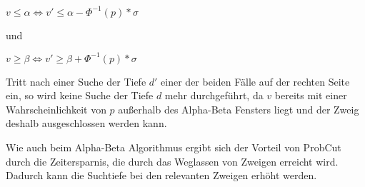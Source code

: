 \hspace*{1.3cm}
\(v\leq\alpha \iff v'\leq\alpha-\Phi^{-1}(p)*\sigma\)

und

\hspace*{1.3cm}
\(v\geq\beta \iff v'\geq\beta+\Phi^{-1}(p)*\sigma\)

Tritt nach einer Suche der Tiefe \(d'\) einer der beiden Fälle auf der rechten Seite ein, so wird keine Suche der Tiefe
\(d\) mehr durchgeführt, da \(v\) bereits mit einer Wahrscheinlichkeit von \(p\) außerhalb des Alpha-Beta Fensters liegt
und der Zweig deshalb ausgeschlossen werden kann.

Wie auch beim Alpha-Beta Algorithmus ergibt sich der Vorteil von ProbCut durch die Zeitersparnis, die durch das
Weglassen von Zweigen erreicht wird. Dadurch kann die Suchtiefe bei den relevanten Zweigen erhöht werden.
\cite[S.~1]{probcut}
